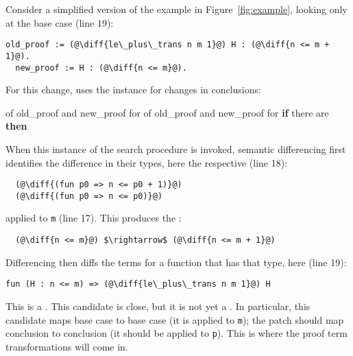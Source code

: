 Consider a simplified version of the example in Figure~\ref{fig:example}, 
looking only at the base case (line 19):

\begin{lstlisting}[language=coq]
  old_proof := (@\diff{le\_plus\_trans n m 1}@) H : (@\diff{n <= m + 1}@).
  new_proof := H : (@\diff{n <= m}@).
\end{lstlisting}
For this change, \sysname uses the instance for changes in conclusions:

\begin{algorithm}
\footnotesize
\begin{algorithmic}[1]
    \STATE {}  of old\_proof and new\_proof for 
    \STATE {}  of old\_proof and new\_proof for 
    \STATE \textbf{if} there are  \textbf{then}
    \STATE \hspace*{1em}  
\end{algorithmic}
\end{algorithm}
When this instance of the search procedure is invoked,
semantic differencing first identifies the difference in their types, here the respective  (line 18):

\begin{lstlisting}
  (@\diff{(fun p0 => n <= p0 + 1)}@)
  (@\diff{(fun p0 => n <= p0)}@)
\end{lstlisting}
applied to \lstinline{m} (line 17).
This produces the  :

\begin{lstlisting}
  (@\diff{n <= m}@) $\rightarrow$ (@\diff{n <= m + 1}@)
\end{lstlisting}
Differencing then diffs the terms for a function that has that type, here (line 19):

\begin{lstlisting}[language=coq]
  fun (H : n <= m) => (@\diff{le\_plus\_trans n m 1}@) H
\end{lstlisting}
This is a .
This candidate is close, but it is not yet a . In particular, this candidate
maps base case to base case (it is applied to \lstinline{m}); the patch should map conclusion to conclusion (it should
be applied to \lstinline{p}).
This is where the proof term transformations will come in.

